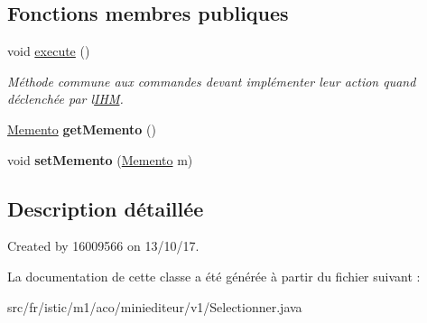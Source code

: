 \subsection*{Fonctions membres publiques}
\begin{DoxyCompactItemize}
\item 
\mbox{\label{classfr_1_1istic_1_1m1_1_1aco_1_1miniediteur_1_1v1_1_1Selectionner_a746abe8d1a13dbb084f37d4b67fa1261}} 
void \hyperlink{classfr_1_1istic_1_1m1_1_1aco_1_1miniediteur_1_1v1_1_1Selectionner_a746abe8d1a13dbb084f37d4b67fa1261}{execute} ()
\begin{DoxyCompactList}\small\item\em Méthode commune aux commandes devant implémenter leur action quand déclenchée par l\textquotesingle{}\hyperlink{interfacefr_1_1istic_1_1m1_1_1aco_1_1miniediteur_1_1v1_1_1IHM}{I\+HM}. \end{DoxyCompactList}\item 
\mbox{\label{classfr_1_1istic_1_1m1_1_1aco_1_1miniediteur_1_1v1_1_1Selectionner_a93bb9249ee51f501735f6b40d77dc3f3}} 
\hyperlink{interfacefr_1_1istic_1_1m1_1_1aco_1_1miniediteur_1_1v1_1_1Memento}{Memento} {\bfseries get\+Memento} ()
\item 
\mbox{\label{classfr_1_1istic_1_1m1_1_1aco_1_1miniediteur_1_1v1_1_1Selectionner_a80d7d18546f239290919a9e602405ffd}} 
void {\bfseries set\+Memento} (\hyperlink{interfacefr_1_1istic_1_1m1_1_1aco_1_1miniediteur_1_1v1_1_1Memento}{Memento} m)
\end{DoxyCompactItemize}


\subsection{Description détaillée}
Created by 16009566 on 13/10/17. 

La documentation de cette classe a été générée à partir du fichier suivant \+:\begin{DoxyCompactItemize}
\item 
src/fr/istic/m1/aco/miniediteur/v1/Selectionner.\+java\end{DoxyCompactItemize}
